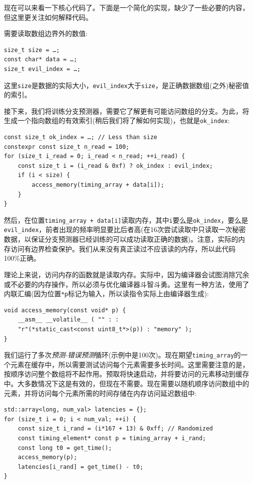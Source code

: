 现在可以来看一下核心代码了。下面是一个简化的实现，缺少了一些必要的内容，但这里更关注如何解释代码。

需要读取数组边界外的数值:

\begin{lstlisting}[style=styleCXX]
size_t size = …;
const char* data = …;
size_t evil_index = …;
\end{lstlisting}

这里\texttt{size}是数据的实际大小，\texttt{evil\_index}大于\texttt{size}，是正确数据数组(之外)秘密值的索引。

接下来，我们将训练分支预测器，需要它了解更有可能访问数组的分支。为此，将生成一个指向数组的有效索引(稍后我们将了解如何实现)，也就是\texttt{ok\_index}:

\begin{lstlisting}[style=styleCXX]
const size_t ok_index = …; // Less than size
constexpr const size_t n_read = 100;
for (size_t i_read = 0; i_read < n_read; ++i_read) {
	const size_t i = (i_read & 0xf) ? ok_index : evil_index;
	if (i < size) {
		access_memory(timing_array + data[i]);
	}
}
\end{lstlisting}

然后，在位置\texttt{timing\_array + data[i]}读取内存，其中\texttt{i}要么是\texttt{ok\_index}，要么是\texttt{evil\_index}，前者出现的频率明显要比后者高(在16次尝试读取中只读取一次秘密数据，以保证分支预测器已经训练的可以成功读取正确的数据)。注意，实际的内存访问有边界检查保护。我们从来没有真正读过不应该读的内存，所以此代码100\%正确。

理论上来说，访问内存的函数就是读取内存。实际中，因为编译器会试图消除冗余或不必要的内存操作，所以必须与优化编译器斗智斗勇。这里有一种方法，使用了内联汇编(因为位置\texttt{*p}标记为输入，所以读指令实际上由编译器生成):

\begin{lstlisting}[style=styleCXX]
void access_memory(const void* p) {
	__asm__ __volatile__ ( "" : :
	"r"(*static_cast<const uint8_t*>(p)) : "memory" );
}
\end{lstlisting}

我们运行了多次\textit{预测-错误预测}循环(示例中是100次)。现在期望\texttt{timing\_array}的一个元素在缓存中，所以需要测试访问每个元素需要多长时间。这里需要注意的是，按顺序访问整个数组将不起作用。预取将快速启动，并将要访问的元素移动到缓存中。大多数情况下这是有效的，但现在不需要。现在需要以随机顺序访问数组中的元素，并将访问每个元素所需的时间存储在内存访问延迟数组中:

\begin{lstlisting}[style=styleCXX]
std::array<long, num_val> latencies = {};
for (size_t i = 0; i < num_val; ++i) {
	const size_t i_rand = (i*167 + 13) & 0xff; // Randomized
	const timing_element* const p = timing_array + i_rand;
	const long t0 = get_time();
	access_memory(p);
	latencies[i_rand] = get_time() - t0;
}
\end{lstlisting}

